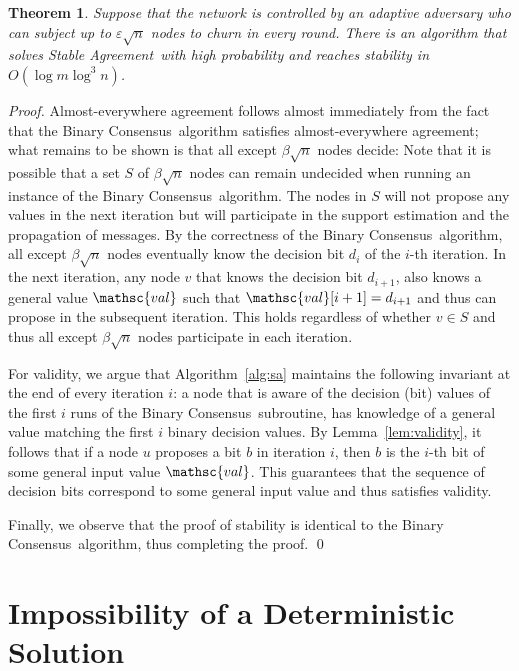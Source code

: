 \documentclass[leqno,11pt]{article}
\newtheorem{theorem}{Theorem}[section]
\newcommand{\eps}{\varepsilon}
\newcommand{\val}{{\mathsc{val}}}
\newcommand{\sa}{{\sc Stable Agreement}}
\newcommand{\bc}{{\sc Binary Consensus}}
\begin{document}
\begin{theorem} \label{thm:adaptiveSA}
  Suppose that the network is controlled by an adaptive adversary who can
  subject up to $\eps\sqrt{n}$ nodes to churn in every round.
  There is an algorithm that solves \sa\ with high probability and reaches stability in $O(\log m \log^3 n)$.
\end{theorem}
\begin{proof}
  Almost-everywhere agreement follows almost immediately from the fact that the \bc\ algorithm satisfies almost-everywhere agreement; what remains to be shown is that all except $\beta \sqrt{n}$ nodes decide:
  Note that it is possible that a set $S$ of $\beta \sqrt{n}$ nodes can remain undecided when running an instance of the \bc\ algorithm.
  The nodes in $S$ will not propose any values in the next iteration but will participate in the support estimation and the propagation of messages.
  By the correctness of the \bc\ algorithm, all except $\beta \sqrt{n}$ nodes eventually know the decision bit $d_i$ of the $i$-th iteration.
  In the next iteration, any node $v$ that knows the decision bit $d_{i+1}$, also knows a general value $\val$ such that $\val[i+1]=d_{i+1}$ and thus can propose in the subsequent iteration.
  This holds regardless of whether $v \in S$ and thus all except $\beta\sqrt{n}$ nodes participate in each iteration.

  For validity, we argue that Algorithm~\ref{alg:sa} maintains the following invariant at the end of every iteration $i$: a node that is aware of the decision (bit) values of the first $i$ runs of the \bc\ subroutine, has knowledge of a general value matching the first $i$ binary decision values.
  By Lemma~\ref{lem:validity}, it follows that if a node $u$ proposes a bit $b$ in iteration $i$, then $b$ is the $i$-th bit of some general input value $\val$.
  This guarantees that the sequence of decision bits correspond to some general input value and thus satisfies validity.

  Finally, we observe that the proof of stability is identical to the \bc\ algorithm, thus completing the proof.
  \qed
\end{proof}





\section{Impossibility of a Deterministic Solution} \label{sec:impossibility}
\end{document}
